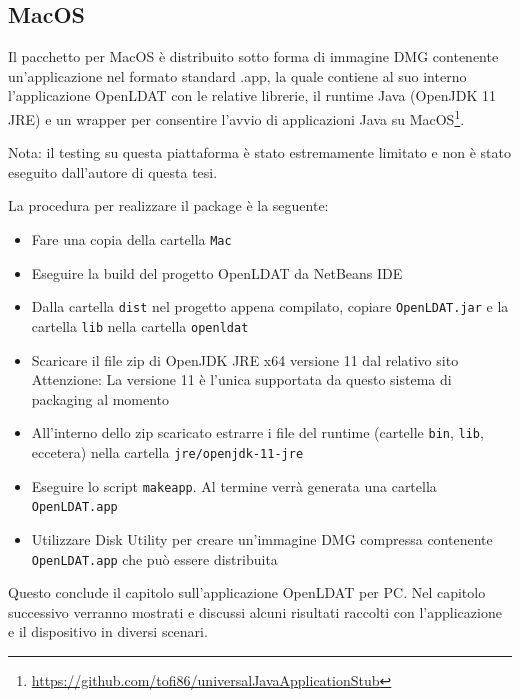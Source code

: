 \subsection{MacOS}
Il pacchetto per MacOS è distribuito sotto forma di immagine DMG contenente un'applicazione nel formato standard .app, la quale contiene al suo interno l'applicazione OpenLDAT con le relative librerie, il runtime Java (OpenJDK 11 JRE) e un wrapper per consentire l'avvio di applicazioni Java su MacOS\footnote{\url{https://github.com/tofi86/universalJavaApplicationStub}}.

Nota: il testing su questa piattaforma è stato estremamente limitato e non è stato eseguito dall'autore di questa tesi.

La procedura per realizzare il package è la seguente:\begin{itemize}
	\item Fare una copia della cartella \texttt{Mac}
	\item Eseguire la build del progetto OpenLDAT da NetBeans IDE
	\item Dalla cartella \texttt{dist} nel progetto appena compilato, copiare \texttt{OpenLDAT.jar} e la cartella \texttt{lib} nella cartella \texttt{openldat}
	\item Scaricare il file zip di OpenJDK JRE x64 versione 11 dal relativo sito\\
	Attenzione: La versione 11 è l'unica supportata da questo sistema di packaging al momento
	\item All'interno dello zip scaricato estrarre i file del runtime (cartelle \texttt{bin}, \texttt{lib}, eccetera) nella cartella \texttt{jre/openjdk-11-jre}
	\item Eseguire lo script \texttt{makeapp}. Al termine verrà generata una cartella \texttt{OpenLDAT.app}
	\item Utilizzare Disk Utility per creare un'immagine DMG compressa contenente \texttt{OpenLDAT.app} che può essere distribuita
\end{itemize}

Questo conclude il capitolo sull'applicazione OpenLDAT per PC. Nel capitolo successivo verranno mostrati e discussi alcuni risultati raccolti con l'applicazione e il dispositivo in diversi scenari.
